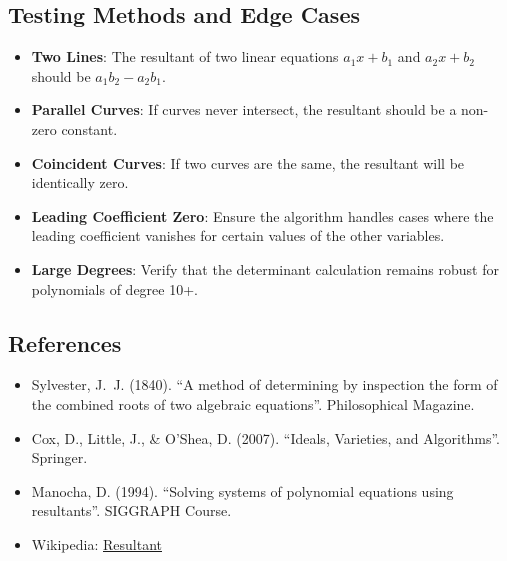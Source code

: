 \subsection{Testing Methods and Edge Cases}
\begin{itemize}
    \item \textbf{Two Lines}: The resultant of two linear equations $a_1 x + b_1$ and $a_2 x + b_2$ should be $a_1 b_2 - a_2 b_1$.
    \item \textbf{Parallel Curves}: If curves never intersect, the resultant should be a non-zero constant.
    \item \textbf{Coincident Curves}: If two curves are the same, the resultant will be identically zero.
    \item \textbf{Leading Coefficient Zero}: Ensure the algorithm handles cases where the leading coefficient vanishes for certain values of the other variables.
    \item \textbf{Large Degrees}: Verify that the determinant calculation remains robust for polynomials of degree 10+.
\end{itemize}

\subsection{References}
\begin{itemize}
    \item Sylvester, J.~J. (1840). ``A method of determining by inspection the form of the combined roots of two algebraic equations''. Philosophical Magazine.
    \item Cox, D., Little, J., \& O'Shea, D. (2007). ``Ideals, Varieties, and Algorithms''. Springer.
    \item Manocha, D. (1994). ``Solving systems of polynomial equations using resultants''. SIGGRAPH Course.
    \item Wikipedia: \href{https://en.wikipedia.org/wiki/Resultant}{Resultant}
\end{itemize}

